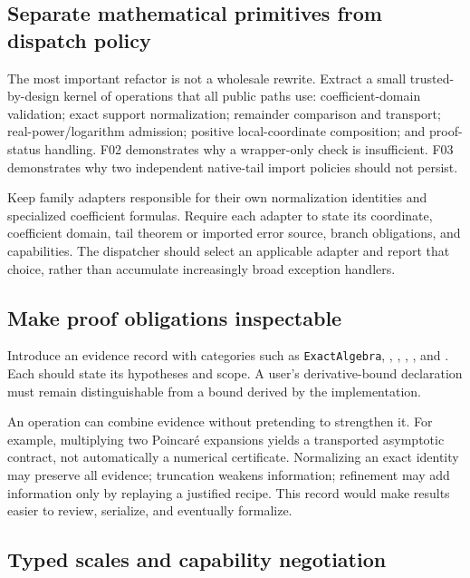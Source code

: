 \subsection{Separate mathematical primitives from dispatch policy}

The most important refactor is not a wholesale rewrite. Extract a small trusted-by-design kernel of operations that all public paths use: coefficient-domain validation; exact support normalization; remainder comparison and transport; real-power/logarithm admission; positive local-coordinate composition; and proof-status handling. F02 demonstrates why a wrapper-only check is insufficient. F03 demonstrates why two independent native-tail import policies should not persist.

Keep family adapters responsible for their own normalization identities and specialized coefficient formulas. Require each adapter to state its coordinate, coefficient domain, tail theorem or imported error source, branch obligations, and capabilities. The dispatcher should select an applicable adapter and report that choice, rather than accumulate increasingly broad exception handlers.

\subsection{Make proof obligations inspectable}

Introduce an evidence record with categories such as \texttt{ExactAlgebra}, , , , , and . Each should state its hypotheses and scope. A user's derivative-bound declaration must remain distinguishable from a bound derived by the implementation.

An operation can combine evidence without pretending to strengthen it. For example, multiplying two Poincar\'e expansions yields a transported asymptotic contract, not automatically a numerical certificate. Normalizing an exact identity may preserve all evidence; truncation weakens information; refinement may add information only by replaying a justified recipe. This record would make results easier to review, serialize, and eventually formalize.

\subsection{Typed scales and capability negotiation}

